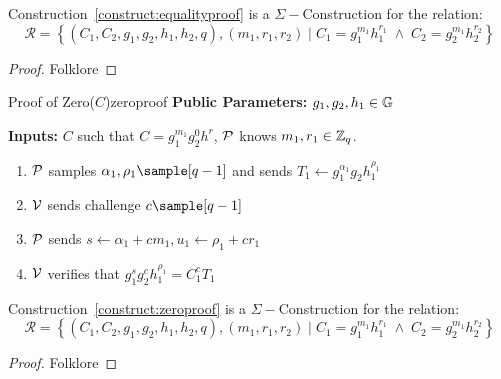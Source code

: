 \begin{theorem}
    Construction~\ref{construct:equalityproof} is a $\Sigma-$Construction for the relation: 
    \[
    \mathcal{R} = \left\{ (C_1, C_2,g_1,g_2,h_1,h_2, q),(m_1,r_1,r_2) \; | \; C_1 = g_1^{m_1}h_1^{r_1} \; \wedge \; C_2 = g_2^{m_1}h_2^{r_2} \right\}
    \]    
\end{theorem}

\begin{proof}
    Folklore
\end{proof}









\begin{construction}{Proof of Zero($C$)}{zeroproof}
    \vspace{1em}
    \textbf{Public Parameters:} $g_1, g_2, h_1\in \mathbb{G}$

    \textbf{Inputs:} $C$ such that $C = g_1^{m_1}g_2^0h^{r}$, $\mathcal{P}$ knows $m_1, r_1 \in \mathbb{Z}_q$.
    \vspace{1em}
        \begin{enumerate}
        \item $\mathcal{P}$ samples $\alpha_1, \rho_1 \sample [q-1]$ and sends $T_1 \gets g_1^{\alpha_1}g_2h_1^{\rho_1}$ 

        \item $\mathcal{V}$ sends challenge $c \sample [q-1]$

        \item $\mathcal{P}$ sends $s \gets \alpha_1 + cm_1, u_1 \gets \rho_1 + cr_1$

        \item $\mathcal{V}$ verifies that $g_1^sg_2^ch_1^{\rho_1} = C_1^cT_1$
    \end{enumerate}
\end{construction}
    

\begin{theorem}
    Construction~\ref{construct:zeroproof} is a $\Sigma-$Construction for the relation: 
    \[
    \mathcal{R} = \left\{ (C_1, C_2,g_1,g_2,h_1,h_2, q),(m_1,r_1,r_2) \; | \; C_1 = g_1^{m_1}h_1^{r_1} \; \wedge \; C_2 = g_2^{m_1}h_2^{r_2} \right\}
    \]    
\end{theorem}

\begin{proof}
    Folklore
\end{proof}






